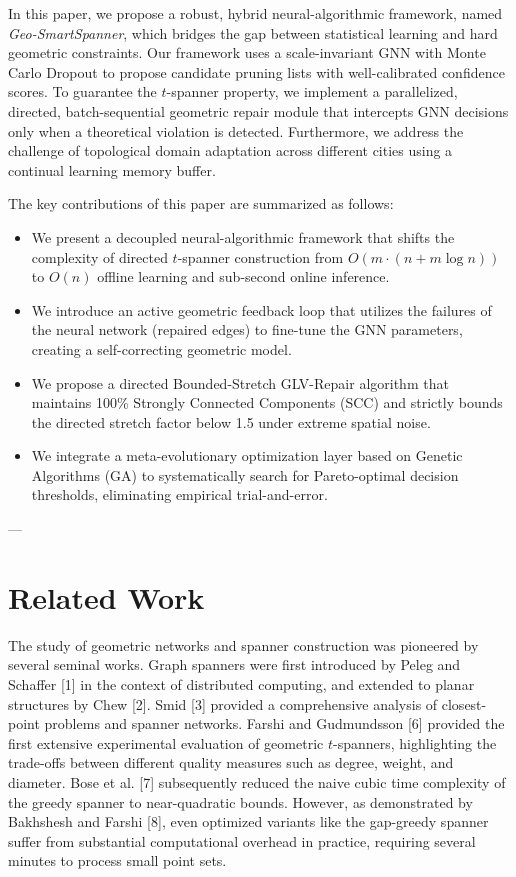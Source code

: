 \documentclass[journal]{IEEEtran}
\begin{document}
In this paper, we propose a robust, hybrid neural-algorithmic framework, named \textit{Geo-SmartSpanner}, which bridges the gap between statistical learning and hard geometric constraints. Our framework uses a scale-invariant GNN with Monte Carlo Dropout to propose candidate pruning lists with well-calibrated confidence scores. To guarantee the $t$-spanner property, we implement a parallelized, directed, batch-sequential geometric repair module that intercepts GNN decisions only when a theoretical violation is detected. Furthermore, we address the challenge of topological domain adaptation across different cities using a continual learning memory buffer.

The key contributions of this paper are summarized as follows:
\begin{itemize}
    \item We present a decoupled neural-algorithmic framework that shifts the complexity of directed $t$-spanner construction from $O(m \cdot (n + m \log n))$ to $O(n)$ offline learning and sub-second online inference.
    \item We introduce an active geometric feedback loop that utilizes the failures of the neural network (repaired edges) to fine-tune the GNN parameters, creating a self-correcting geometric model.
    \item We propose a directed Bounded-Stretch GLV-Repair algorithm that maintains 100\% Strongly Connected Components (SCC) and strictly bounds the directed stretch factor below 1.5 under extreme spatial noise.
    \item We integrate a meta-evolutionary optimization layer based on Genetic Algorithms (GA) to systematically search for Pareto-optimal decision thresholds, eliminating empirical trial-and-error.
\end{itemize}

---

\section{Related Work}
The study of geometric networks and spanner construction was pioneered by several seminal works. Graph spanners were first introduced by Peleg and Schaffer [1] in the context of distributed computing, and extended to planar structures by Chew [2]. Smid [3] provided a comprehensive analysis of closest-point problems and spanner networks. Farshi and Gudmundsson [6] provided the first extensive experimental evaluation of geometric $t$-spanners, highlighting the trade-offs between different quality measures such as degree, weight, and diameter. Bose et al. [7] subsequently reduced the naive cubic time complexity of the greedy spanner to near-quadratic bounds. However, as demonstrated by Bakhshesh and Farshi [8], even optimized variants like the gap-greedy spanner suffer from substantial computational overhead in practice, requiring several minutes to process small point sets.
\end{document}
